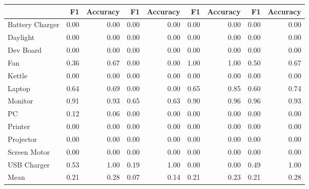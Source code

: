 \begin{tabular}{lrrrrrrrr}
\toprule
{} &    F1 &  Accuracy &    F1 &  Accuracy &    F1 &  Accuracy &    F1 &  Accuracy \\
\midrule
Battery Charger &  0.00 &      0.00 &  0.00 &      0.00 &  0.00 &      0.00 &  0.00 &      0.00 \\
Daylight        &  0.00 &      0.00 &  0.00 &      0.00 &  0.00 &      0.00 &  0.00 &      0.00 \\
Dev Board       &  0.00 &      0.00 &  0.00 &      0.00 &  0.00 &      0.00 &  0.00 &      0.00 \\
Fan             &  0.36 &      0.67 &  0.00 &      0.00 &  1.00 &      1.00 &  0.50 &      0.67 \\
Kettle          &  0.00 &      0.00 &  0.00 &      0.00 &  0.00 &      0.00 &  0.00 &      0.00 \\
Laptop          &  0.64 &      0.69 &  0.00 &      0.00 &  0.65 &      0.85 &  0.60 &      0.74 \\
Monitor         &  0.91 &      0.93 &  0.65 &      0.63 &  0.90 &      0.96 &  0.96 &      0.93 \\
PC              &  0.12 &      0.06 &  0.00 &      0.00 &  0.00 &      0.00 &  0.00 &      0.00 \\
Printer         &  0.00 &      0.00 &  0.00 &      0.00 &  0.00 &      0.00 &  0.00 &      0.00 \\
Projector       &  0.00 &      0.00 &  0.00 &      0.00 &  0.00 &      0.00 &  0.00 &      0.00 \\
Screen Motor    &  0.00 &      0.00 &  0.00 &      0.00 &  0.00 &      0.00 &  0.00 &      0.00 \\
USB Charger     &  0.53 &      1.00 &  0.19 &      1.00 &  0.00 &      0.00 &  0.49 &      1.00 \\
Mean            &  0.21 &      0.28 &  0.07 &      0.14 &  0.21 &      0.23 &  0.21 &      0.28 \\
\bottomrule
\end{tabular}
